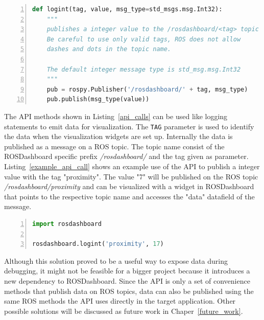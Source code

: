 \begin{lstlisting}[frame=single,caption={Implemented logint API method.},label=api_implementation,language=Python,numbers=left,breaklines=true]
def logint(tag, value, msg_type=std_msgs.msg.Int32):
    """
    publishes a integer value to the /rosdashboard/<tag> topic
    Be careful to use only valid tags, ROS does not allow
    dashes and dots in the topic name.
    
    The default integer message type is std_msg.msg.Int32
    """
    pub = rospy.Publisher('/rosdashboard/' + tag, msg_type)
    pub.publish(msg_type(value))
\end{lstlisting}

The API methods shown in Listing~\ref{api_calls} can be used like logging statements to emit data for visualization. The \verb+TAG+ parameter is used to identify the data when the visualization widgets are set up. Internally the data is published as a message on a ROS topic. The topic name consist of the ROSDashboard specific prefix \emph{/rosdashboard/} and the tag given as parameter. Listing~\ref{example_api_call} shows an example use of the API to publish a integer value with the tag "proximity". The value "7" will be published on the ROS topic \emph{/rosdashboard/proximity} and can be visualized with a widget in ROSDashboard that points to the respective topic name and accesses the "data" datafield of the message.

\begin{lstlisting}[frame=single,caption={Example API usage.},label=example_api_call,language=Python,numbers=left,breaklines=true]
import rosdashboard

rosdashboard.logint('proximity', 17)
\end{lstlisting}

Although this solution proved to be a useful way to expose data during debugging, it might not be feasible for a bigger project because it introduces a new dependency to ROSDashboard. Since the API is only a set of convenience methods that publish data on ROS topics, data can also be published using the same ROS methods the API uses directly in the target application. Other possible solutions will be discussed as future work in Chaper~\ref{future_work}.
